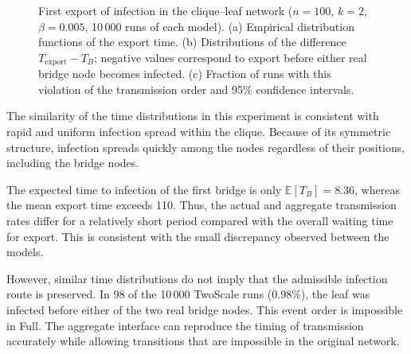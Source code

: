 \documentclass{ieeeaccess}
\newcommand{\Full}{\textup{Full}}
\newcommand{\TS}{\textup{TwoScale}}
\begin{document}
\begin{figure}[!tbp]
\caption{%
First export of infection in the clique--leaf network ($n=100$, $k=2$, $\beta=0.005$, 10\,000 runs of each model).
(a) Empirical distribution functions of the export time.
(b) Distributions of the difference $T_{\mathrm{export}}-T_B$; negative values correspond to export before either real bridge node becomes infected.
(c) Fraction of runs with this violation of the transmission order and 95\% confidence intervals.
}
\label{fig:clique_leaf}
\end{figure}

The similarity of the time distributions in this experiment is consistent with rapid and uniform infection spread within the clique. Because of its symmetric structure, infection spreads quickly among the nodes regardless of their positions, including the bridge nodes.

The expected time to infection of the first bridge is only $\mathbb{E}[T_B]=8.36$, whereas the mean export time exceeds 110. Thus, the actual and aggregate transmission rates differ for a relatively short period compared with the overall waiting time for export. This is consistent with the small discrepancy observed between the models.

However, similar time distributions do not imply that the admissible infection route is preserved. In 98 of the 10\,000 \TS{} runs (0.98\%), the leaf was infected before either of the two real bridge nodes. This event order is impossible in \Full{}. The aggregate interface can reproduce the timing of transmission accurately while allowing transitions that are impossible in the original network.
\end{document}

